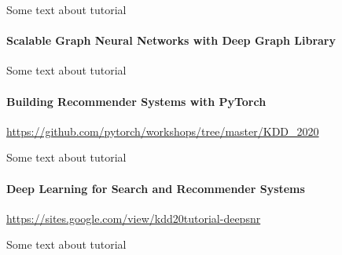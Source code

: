 Some text about tutorial

\paragraph{Scalable Graph Neural Networks with Deep Graph Library} $ $\\

Some text about tutorial

\paragraph{Building Recommender Systems with PyTorch} $ $\\

\url{https://github.com/pytorch/workshops/tree/master/KDD_2020}

Some text about tutorial

\paragraph{Deep Learning for Search and Recommender Systems} $ $\\

\url{https://sites.google.com/view/kdd20tutorial-deepsnr}

Some text about tutorial



